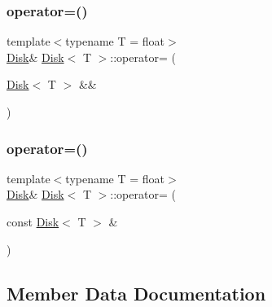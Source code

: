 \mbox{\label{classDisk_ad6bc474ffecbc5de6f8fdd90ba5eddfe}} 
\subsubsection{\texorpdfstring{operator=()}{operator=()}\hspace{0.1cm}{\footnotesize\ttfamily [1/2]}}
{\footnotesize\ttfamily template$<$typename T  = float$>$ \\
\mbox{\hyperlink{classDisk}{Disk}}\& \mbox{\hyperlink{classDisk}{Disk}}$<$ T $>$\+::operator= (\begin{DoxyParamCaption}\item[{\mbox{\hyperlink{classDisk}{Disk}}$<$ T $>$ \&\&}]{ }\end{DoxyParamCaption})\hspace{0.3cm}{\ttfamily [default]}}

\mbox{\label{classDisk_a3ef862dd6e4671c907e2368bb5239bd2}} 
\subsubsection{\texorpdfstring{operator=()}{operator=()}\hspace{0.1cm}{\footnotesize\ttfamily [2/2]}}
{\footnotesize\ttfamily template$<$typename T  = float$>$ \\
\mbox{\hyperlink{classDisk}{Disk}}\& \mbox{\hyperlink{classDisk}{Disk}}$<$ T $>$\+::operator= (\begin{DoxyParamCaption}\item[{const \mbox{\hyperlink{classDisk}{Disk}}$<$ T $>$ \&}]{ }\end{DoxyParamCaption})\hspace{0.3cm}{\ttfamily [default]}}



\subsection{Member Data Documentation}
\mbox{\label{classDisk_aa008e8bd0e7acdb4a1a56a8f44f048d7}} 

